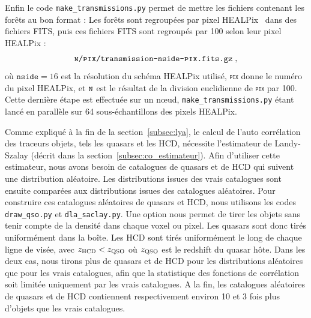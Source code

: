 Enfin le code \texttt{make\_transmissions.py} permet de mettre les fichiers contenant les forêts au bon format :
Les forêts sont regroupées par pixel HEALPix~\autocite{Gorski2004} dans des fichiers FITS, puis ces fichiers FITS sont regroupés par 100 selon leur pixel HEALPix :
\begin{equation*}
  \texttt{\textsc{n}/\textsc{pix}/transmission-nside-\textsc{pix}.fits.gz} \; ,
\end{equation*}
où $\texttt{nside} = \num{16}$ est la résolution du schéma HEALPix utilisé, \texttt{\textsc{pix}} donne le numéro du pixel HEALPix, et $\texttt{\textsc{n}}$ est le résultat de la division euclidienne de \texttt{\textsc{pix}} par \num{100}.
Cette dernière étape est effectuée sur un nœud, \texttt{make\_transmissions.py} étant lancé en parallèle sur 64 sous-échantillons des pixels HEALPix.

Comme expliqué à la fin de la section~\ref{subsec:lya}, le calcul de l'auto corrélation des traceurs objets, tels les quasars et les HCD, nécessite l'estimateur de Landy-Szalay (décrit dans la section~\ref{subsec:co_estimateur}). Afin d'utiliser cette estimateur, nous avons besoin de catalogues de quasars et de HCD qui suivent une distribution aléatoire.
Les distributions issues des vrais catalogues sont ensuite comparées aux distributions issues des catalogues aléatoires.
Pour construire ces catalogues aléatoires de quasars et HCD, nous utilisons les codes \texttt{draw\_qso.py} et \texttt{dla\_saclay.py}. Une option nous permet de tirer les objets sans tenir compte de la densité dans chaque voxel ou pixel. Les quasars sont donc tirés uniformément dans la boîte. Les HCD sont tirés uniformément le long de chaque ligne de visée, avec $z_{\textsc{HCD}} < z_{\textsc{QSO}}$ où $z_{\textsc{QSO}}$ est le redshift du quasar hôte. Dans les deux cas, nous tirons plus de quasars et de HCD pour les distributions aléatoires que pour les vrais catalogues, afin que la statistique des fonctions de corrélation soit limitée uniquement par les vrais catalogues. A la fin, les catalogues aléatoires de quasars et de HCD contiennent respectivement environ 10 et 3 fois plus d'objets que les vrais catalogues.



